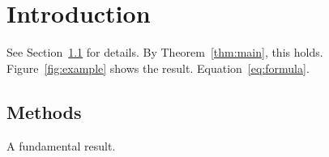 

\chapter{Introduction}

See Section~\ref{sec:methods} for details.
By Theorem~\ref{thm:main}, this holds.
Figure~\ref{fig:example} shows the result.
Equation~\eqref{eq:formula}.

\section{Methods}
\label{sec:methods}

\begin{theorem}
\label{thm:main}
A fundamental result.
\end{theorem}


